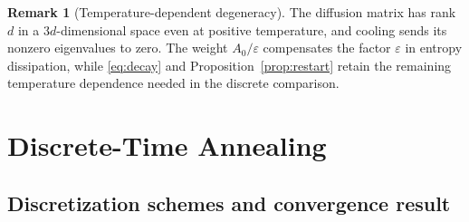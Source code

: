 \documentclass[11pt]{article}
\theoremstyle{definition}
\newtheorem{remark}[theorem]{Remark}
\newcommand{\eps}{\varepsilon}
\begin{document}
\begin{remark}[Temperature-dependent degeneracy]\label{rem:degeneracy}
The diffusion matrix has rank $d$ in a $3d$-dimensional space even at positive
temperature, and cooling sends its nonzero eigenvalues to zero. The weight
$A_0/\eps$ compensates the factor $\eps$ in entropy dissipation, while
\eqref{eq:decay} and Proposition~\ref{prop:restart} retain the remaining
temperature dependence needed in the discrete comparison.
\end{remark}

\section{Discrete-Time Annealing}\label{sec:discrete}
\subsection{Discretization schemes and convergence result}
\end{document}
